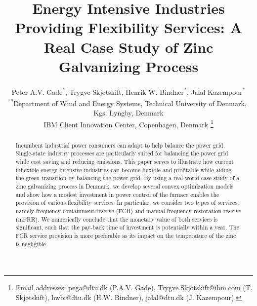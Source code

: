 \documentclass[conference]{IEEEtran}
\begin{document}
\title{Energy Intensive Industries Providing Flexibility Services: A Real Case Study of Zinc Galvanizing Process}

\author{Peter A.V. Gade\textsuperscript{*}\textsuperscript{\textdagger}, Trygve Skjøtskift\textsuperscript{\textdagger}, Henrik W. Bindner\textsuperscript{*}, Jalal Kazempour\textsuperscript{*} \\
    \textsuperscript{*}Department of Wind and Energy Systems, Technical University of Denmark, Kgs. Lyngby, Denmark \\
    \textsuperscript{\textdagger}IBM Client Innovation Center, Copenhagen, Denmark
    \thanks{
        Email addresses: pega@dtu.dk (P.A.V. Gade), Trygve.Skjotskift@ibm.com (T. Skjøtskift), hwbi@dtu.dk (H.W. Bindner), jalal@dtu.dk (J. Kazempour).}%

    \vspace{-3mm}
}

\maketitle

\IEEEaftertitletext{\vspace{-0.8\baselineskip}}
\maketitle
\thispagestyle{plain}
\pagestyle{plain}

\begin{abstract}
    Incumbent industrial power consumers can adapt to help balance the power grid. Single-state industry processes are particularly suited for balancing the power grid while cost saving and reducing emissions. This paper serves to illustrate how current inflexible energy-intensive industries can become flexible and profitable while aiding the green transition by balancing the power grid. By using a real-world case study of a zinc galvanizing process in Denmark, we develop several convex optimization models and show how a modest investment in power control of the furnace enables the provision of various flexibility services. In particular, we consider two types of services, namely frequency containment reserve (FCR) and manual frequency restoration reserve (mFRR). We numerically conclude that the monetary value of both services is significant, such that the pay-back time of investment is potentially within a year. The FCR service provision is more preferable as its impact on the temperature of the zinc is negligible.
\end{abstract}
\end{document}
